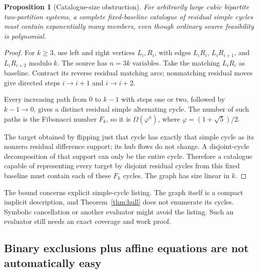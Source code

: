 \documentclass[11pt,letterpaper]{article}
\newtheorem{proposition}[theorem]{Proposition}
\theoremstyle{definition}
\begin{document}
\begin{proposition}[Catalogue-size obstruction]\label{prop:catalogue}
For arbitrarily large cubic bipartite two-partition systems, a complete fixed-baseline catalogue of residual simple cycles must contain exponentially many members, even though ordinary source feasibility is polynomial.
\end{proposition}
\begin{proof}
For $k\ge3$, use left and right vertices $L_i,R_i$, with edges $L_iR_i$, $L_iR_{i+1}$, and $L_iR_{i+2}$ modulo $k$. The source has $n=3k$ variables. Take the matching $L_iR_i$ as baseline. Contract its reverse residual matching arcs; nonmatching residual moves give directed steps $i\to i+1$ and $i\to i+2$.

Every increasing path from $0$ to $k-1$ with steps one or two, followed by $k-1\to0$, gives a distinct residual simple alternating cycle. The number of such paths is the Fibonacci number $F_k$, so it is $\Omega(\varphi^k)$, where $\varphi=(1+\sqrt5)/2$.

The target obtained by flipping just that cycle has exactly that simple cycle as its nonzero residual difference support; its hub flows do not change. A disjoint-cycle decomposition of that support can only be the entire cycle. Therefore a catalogue capable of representing every target by disjoint residual cycles from this fixed baseline must contain each of these $F_k$ cycles. The graph has size linear in $k$.
\end{proof}

The bound concerns explicit simple-cycle listing. The graph itself is a compact implicit description, and Theorem~\ref{thm:hull} does not enumerate its cycles. Symbolic cancellation or another evaluator might avoid the listing. Such an evaluator still needs an exact coverage and work proof.

\subsection{Binary exclusions plus affine equations are not automatically easy}
\end{document}
